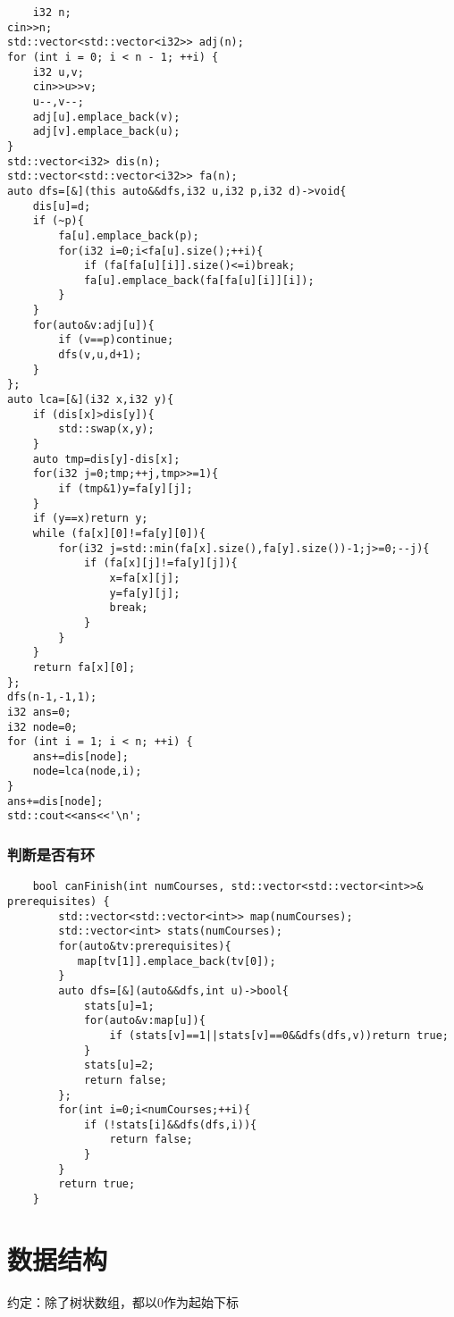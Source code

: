 \documentclass[UTF8]{ctexart}
\begin{document}
\begin{lstlisting}
    i32 n;
cin>>n;
std::vector<std::vector<i32>> adj(n);
for (int i = 0; i < n - 1; ++i) {
    i32 u,v;
    cin>>u>>v;
    u--,v--;
    adj[u].emplace_back(v);
    adj[v].emplace_back(u);
}
std::vector<i32> dis(n);
std::vector<std::vector<i32>> fa(n);
auto dfs=[&](this auto&&dfs,i32 u,i32 p,i32 d)->void{
    dis[u]=d;
    if (~p){
        fa[u].emplace_back(p);
        for(i32 i=0;i<fa[u].size();++i){
            if (fa[fa[u][i]].size()<=i)break;
            fa[u].emplace_back(fa[fa[u][i]][i]);
        }
    }
    for(auto&v:adj[u]){
        if (v==p)continue;
        dfs(v,u,d+1);
    }
};
auto lca=[&](i32 x,i32 y){
    if (dis[x]>dis[y]){
        std::swap(x,y);
    }
    auto tmp=dis[y]-dis[x];
    for(i32 j=0;tmp;++j,tmp>>=1){
        if (tmp&1)y=fa[y][j];
    }
    if (y==x)return y;
    while (fa[x][0]!=fa[y][0]){
        for(i32 j=std::min(fa[x].size(),fa[y].size())-1;j>=0;--j){
            if (fa[x][j]!=fa[y][j]){
                x=fa[x][j];
                y=fa[y][j];
                break;
            }
        }
    }
    return fa[x][0];
};
dfs(n-1,-1,1);
i32 ans=0;
i32 node=0;
for (int i = 1; i < n; ++i) {
    ans+=dis[node];
    node=lca(node,i);
}
ans+=dis[node];
std::cout<<ans<<'\n';
\end{lstlisting}
\subsubsection{判断是否有环}
\begin{lstlisting}
    bool canFinish(int numCourses, std::vector<std::vector<int>>& prerequisites) {
        std::vector<std::vector<int>> map(numCourses);
        std::vector<int> stats(numCourses);
        for(auto&tv:prerequisites){
           map[tv[1]].emplace_back(tv[0]);
        }
        auto dfs=[&](auto&&dfs,int u)->bool{
            stats[u]=1;
            for(auto&v:map[u]){
                if (stats[v]==1||stats[v]==0&&dfs(dfs,v))return true;
            }
            stats[u]=2;
            return false;
        };
        for(int i=0;i<numCourses;++i){
            if (!stats[i]&&dfs(dfs,i)){
                return false;
            }
        }
        return true;
    }
\end{lstlisting}
\section{数据结构}
约定：除了树状数组，都以0作为起始下标
\end{document}

